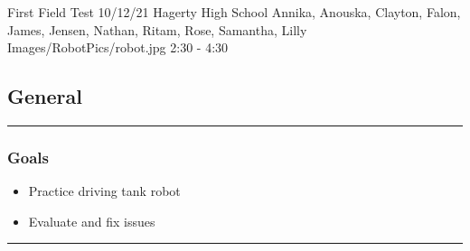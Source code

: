 \insertmeeting 
	{First Field Test} 
	{10/12/21}
	{Hagerty High School}
	{Annika, Anouska, Clayton, Falon, James, Jensen, Nathan, Ritam, Rose, Samantha, Lilly}
	{Images/RobotPics/robot.jpg}
	{2:30 - 4:30}
	
\subsection*{General}
\noindent\hfil\rule{\textwidth}{.4pt}\hfil
\subsubsection*{Goals}
\begin{itemize}
    \item Practice driving tank robot
    \item Evaluate and fix issues 

\end{itemize} 

\noindent\hfil\rule{\textwidth}{.4pt}\hfil

